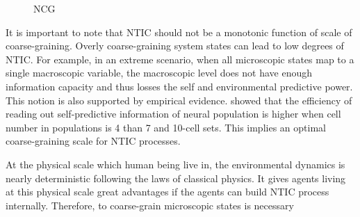 \documentclass[utf8]{article}
\begin{document}
		\begin{figure}
			\caption{NCG \citep{guttenberg2016neural}}
			\label{fig:NCG}
		\end{figure}		
		

		It is important to note that NTIC should not be a monotonic function of scale of coarse-graining. Overly coarse-graining system states can lead to low degrees of NTIC. For example, in an extreme scenario, when all microscopic states map to a single macroscopic variable, the macroscopic level does not have enough information capacity and thus losses  the self and environmental predictive power. This notion is also supported by empirical evidence. \cite{sederberg2018learning} showed that the efficiency of reading out  self-predictive information of neural population is higher when cell number in populations is 4 than 7 and 10-cell sets. This implies an optimal coarse-graining scale for NTIC processes. %


        
        At the physical scale which human being live in, the environmental dynamics is nearly deterministic following the laws of classical physics. It gives agents living at this physical scale great advantages if the agents can build NTIC process internally. Therefore, to coarse-grain microscopic states is necessary 
        
        
\end{document}

